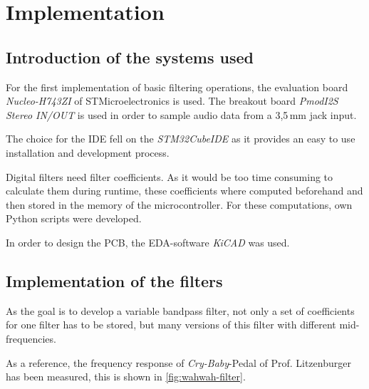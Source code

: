 \section{Implementation}

\subsection{Introduction of the systems used}

For the first implementation of basic filtering operations, the evaluation board \textit{Nucleo-H743ZI} of STMicroelectronics
is used. The breakout board \textit{PmodI2S Stereo IN/OUT} is used in order to sample audio data from a 3,5\,mm jack input.

The choice for the \ac{IDE} fell on the
\newline \textit{STM32CubeIDE} as it provides an easy to use installation and
development process.

Digital filters need filter coefficients. As it would be too time consuming to calculate them during runtime, these
coefficients where computed beforehand and then stored in the memory of the microcontroller. For these computations,
own Python scripts were developed.

In order to design the \ac{PCB}, the \ac{EDA}-software \textit{KiCAD} was used.

\subsection{Implementation of the filters}

As the goal is to develop a variable bandpass filter, not only a set of coefficients for one filter has to be stored,
but many versions of this filter with different mid-frequencies.

As a reference, the frequency response of \textit{Cry-Baby}-Pedal of Prof. Litzenburger has been measured, this is
shown in \autoref{fig:wahwah-filter}.

